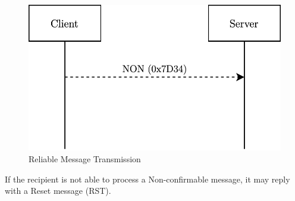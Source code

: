 \documentclass[11pt]{book}
\begin{document}
\begin{itemize}
\begin{itemize}
\begin{figure}[H]
	\centering
	\includegraphics [scale=0.175] {unmessaging.png}
	\caption{Reliable Message Transmission}
\end{figure}
If the recipient is not able to process a Non-confirmable message, it may reply with a Reset message (RST).
\end{itemize}
\end{itemize}
\end{document}
